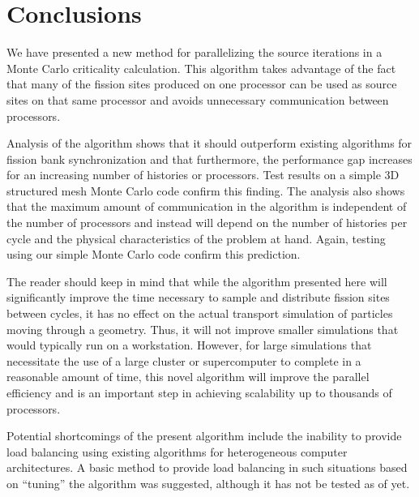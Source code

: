 \section{Conclusions}
\label{sec:conclusions}

We have presented a new method for parallelizing the source iterations in a
Monte Carlo criticality calculation. This algorithm takes advantage of the fact
that many of the fission sites produced on one processor can be used as source
sites on that same processor and avoids unnecessary communication between
processors.

Analysis of the algorithm shows that it should outperform existing algorithms
for fission bank synchronization and that furthermore, the performance gap
increases for an increasing number of histories or processors. Test results on a
simple 3D structured mesh Monte Carlo code confirm this finding. The analysis
also shows that the maximum amount of communication in the algorithm is
independent of the number of processors and instead will depend on the number of
histories per cycle and the physical characteristics of the problem at
hand. Again, testing using our simple Monte Carlo code confirm this prediction.

The reader should keep in mind that while the algorithm presented here will
significantly improve the time necessary to sample and distribute fission sites
between cycles, it has no effect on the actual transport simulation of particles
moving through a geometry. Thus, it will not improve smaller simulations that
would typically run on a workstation. However, for large simulations that
necessitate the use of a large cluster or supercomputer to complete in a
reasonable amount of time, this novel algorithm will improve the parallel
efficiency and is an important step in achieving scalability up to thousands of
processors.

Potential shortcomings of the present algorithm include the inability to provide
load balancing using existing algorithms for heterogeneous computer
architectures. A basic method to provide load balancing in such situations based
on ``tuning'' the algorithm was suggested, although it has not be tested as of
yet.




